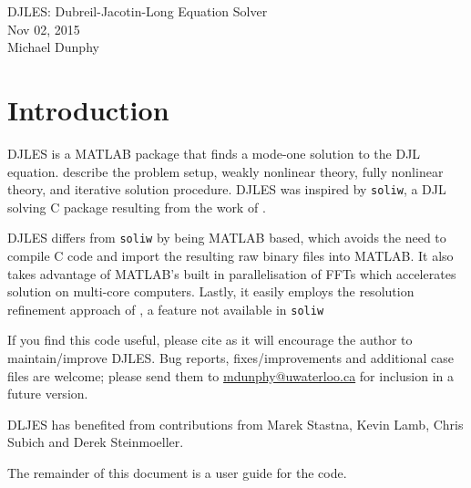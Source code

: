 \documentclass[letterpaper]{article}
\begin{document}
\newpage
\pagestyle{plain}
\setcounter{page}{1}

\begin{center}
\huge{DJLES: Dubreil-Jacotin-Long Equation Solver}\\[1em]
\large{Nov 02, 2015}\\
Michael Dunphy
\end{center}

\section{Introduction}
DJLES is a MATLAB package that finds a mode-one solution to the DJL equation. \cite{StastnaLamb2002} describe the problem setup, weakly nonlinear theory, fully nonlinear theory, and iterative solution procedure. DJLES was inspired by \verb+soliw+, a DJL solving C package resulting from the work of \cite{StastnaLamb2002}.

DJLES differs from \verb+soliw+ by being MATLAB based, which avoids the need to compile C code and import the resulting raw binary files into MATLAB. It also takes advantage of MATLAB's built in parallelisation of FFTs which accelerates solution on multi-core computers. Lastly, it easily employs the resolution refinement approach of \cite{DunphySubichStastna2011}, a feature not available in \verb+soliw+

If you find this code useful, please cite \cite{DunphySubichStastna2011} as it will encourage the author to maintain/improve DJLES. Bug reports, fixes/improvements and additional case files are welcome; please send them to \href{mailto:mdunphy@uwaterloo.ca}{mdunphy@uwaterloo.ca} for inclusion in a future version.

DLJES has benefited from contributions from Marek Stastna, Kevin Lamb, Chris Subich and Derek Steinmoeller.

The remainder of this document is a user guide for the code.
\end{document}
